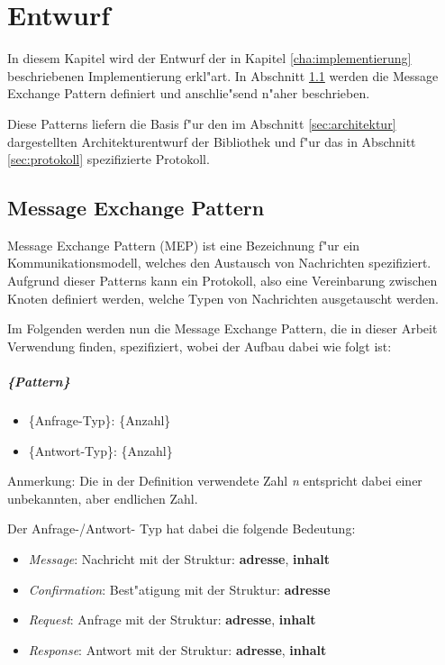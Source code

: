 \chapter{Entwurf}
\label{cha:entwurf}

In diesem Kapitel wird der Entwurf der in Kapitel \ref{cha:implementierung} beschriebenen Implementierung erkl"art. In Abschnitt \ref{sec:mep} werden die Message Exchange Pattern definiert und anschlie"send n"aher beschrieben. 

Diese Patterns liefern die Basis f"ur den im Abschnitt \ref{sec:architektur} dargestellten Architekturentwurf der Bibliothek und f"ur das in Abschnitt \ref{sec:protokoll} spezifizierte Protokoll.

\section{Message Exchange Pattern}
\label{sec:mep}


Message Exchange Pattern (MEP) ist eine Bezeichnung f"ur ein Kommunikationsmodell, welches den Austausch von Nachrichten spezifiziert. Aufgrund dieser Patterns kann ein Protokoll, also eine Vereinbarung zwischen Knoten definiert werden, welche Typen von Nachrichten ausgetauscht werden.

Im Folgenden werden nun die Message Exchange Pattern, die in dieser Arbeit Verwendung finden, spezifiziert, wobei der Aufbau dabei wie folgt ist:
\paragraph{\{Pattern\}}
\begin{itemize}
\item \{Anfrage-Typ\}: \{Anzahl\} 
\item \{Antwort-Typ\}: \{Anzahl\}
\end{itemize}
Anmerkung: Die in der Definition verwendete Zahl {\it n} entspricht dabei einer unbekannten, aber endlichen Zahl.

Der Anfrage-/Antwort- Typ hat dabei die folgende Bedeutung:
\begin{itemize}
\item {\it Message}: Nachricht mit der Struktur: {\bf adresse}, {\bf inhalt}
\item {\it Confirmation}: Best"atigung mit der Struktur: {\bf adresse}
\item {\it Request}: Anfrage mit der Struktur: {\bf adresse}, {\bf inhalt}
\item{\it Response}: Antwort mit der Struktur: {\bf adresse}, {\bf inhalt}
\end{itemize}

